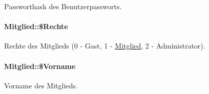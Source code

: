 Passworthash des Benutzerpassworts. 

\hypertarget{classMitglied_adadc54a72a46a089ddec43855ba3c7e}{
\paragraph[\$Rechte]{\setlength{\rightskip}{0pt plus 5cm}Mitglied::\$Rechte}\hfill}
\label{classMitglied_adadc54a72a46a089ddec43855ba3c7e}


Rechte des Mitglieds (0 - Gast, 1 - \hyperlink{classMitglied}{Mitglied}, 2 - Administrator). 

\hypertarget{classMitglied_157424daca1ecda5b6f6a3e0f24ecfce}{
\paragraph[\$Vorname]{\setlength{\rightskip}{0pt plus 5cm}Mitglied::\$Vorname}\hfill}
\label{classMitglied_157424daca1ecda5b6f6a3e0f24ecfce}


Vorname des Mitglieds. 

